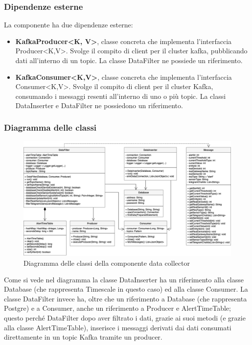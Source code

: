 		\subsubsection{Dipendenze esterne}
			La componente ha due dipendenze esterne:
			\begin{itemize}
				\item \textbf{KafkaProducer<K, V>}, classe concreta che implementa l'interfaccia Producer<K,V>. Svolge il compito di client per il cluster kafka, pubblicando dati all'interno di un topic. La classe DataFilter ne possiede un riferimento.
				\item \textbf{KafkaConsumer<K,V>}, classe concreta che implementa l'interfaccia Consumer<K,V>. Svolge il compito di client per il cluster Kafka, consumando i messaggi resenti all'interno di uno o più topic. La classi DataInserter e DataFilter ne possiedono un riferimento.	
			\end{itemize}	
		\begin{landscape}
		\subsubsection{Diagramma delle classi}%
			\begin{figure}[H]
				\centering
				\includegraphics[scale=0.550]{res/images/DATACOLLECTOR/ClassikafkaDataCollector.png}
				\caption{Diagramma delle classi della componente data collector}
				\label{Diagramma 6}
			\end{figure}
		Come si vede nel diagramma la classe DataInserter ha un riferimento alla classe Database (che rappresenta Timescale in questo caso) ed alla classe Consumer.
		\newline
		La classe DataFilter invece ha, oltre che un riferimento a Database (che rappresenta Postgre) e a Consumer, anche un riferimento a Producer e AlertTimeTable; questo perché DataFilter dopo aver filtrato i dati, grazie ai suoi metodi (e grazie alla classe AlertTimeTable), inserisce i messaggi derivati dai dati consumati direttamente in un topic Kafka tramite un producer.  
		\end{landscape}

